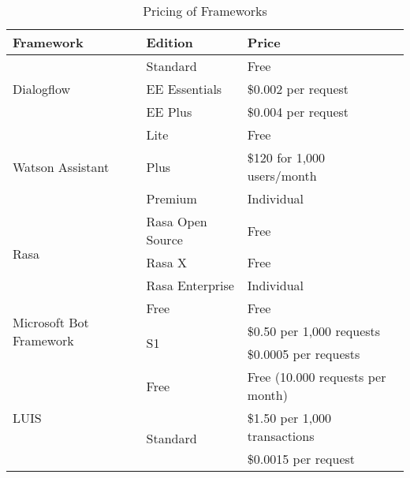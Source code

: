 \begin{table}[H]
    \centering
    \begin{tabular}{ l | l | l }
        Framework & Edition & Price \\ \hline \hline
        \multirow{3}{*}{Dialogflow} & Standard & Free \\
        & EE Essentials &  \$0.002 per request\\
        & EE Plus & \$0.004 per request \\ \hline

        \multirow{3}{*}{Watson Assistant} & Lite & Free \\
        & Plus &  \$120 for 1,000 users/month\\
        & Premium & Individual \\ \hline

        \multirow{3}{*}{Rasa} & Rasa Open Source & Free \\
        & Rasa X &  Free\\
        & Rasa Enterprise & Individual \\ \hline

        
        \multirow{3}{*}{Microsoft Bot Framework} & Free  & Free \\
        & \multirow{2}{*}{S1} & \$0.50 per 1,000 requests \\ 
        & & \$0.0005 per requests \\ \hline
                
        \multirow{3}{*}{LUIS} & Free  & Free (10.000 requests per month) \\
        & \multirow{2}{*}{Standard} &  \$1.50 per 1,000 transactions\\
        & &  \$0.0015 per request
    \end{tabular}
    \caption{Pricing of Frameworks \cite{rasa, dialogflow, watsonassistant,luisdocs}} \label{tab:pricing}
\end{table} \noindent


